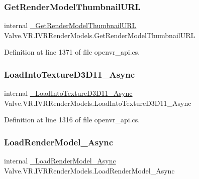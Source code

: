 \subsubsection{\texorpdfstring{GetRenderModelThumbnailURL}{GetRenderModelThumbnailURL}}
{\footnotesize\ttfamily internal \mbox{\hyperlink{struct_valve_1_1_v_r_1_1_i_v_r_render_models_afd1ebaace88f5874dc31699503bba86e}{\+\_\+\+Get\+Render\+Model\+Thumbnail\+U\+RL}} Valve.\+V\+R.\+I\+V\+R\+Render\+Models.\+Get\+Render\+Model\+Thumbnail\+U\+RL}



Definition at line 1371 of file openvr\+\_\+api.\+cs.

\mbox{\label{struct_valve_1_1_v_r_1_1_i_v_r_render_models_a1f79607150d419aba923b85209d1ea24}} 
\subsubsection{\texorpdfstring{LoadIntoTextureD3D11\_Async}{LoadIntoTextureD3D11\_Async}}
{\footnotesize\ttfamily internal \mbox{\hyperlink{struct_valve_1_1_v_r_1_1_i_v_r_render_models_a819d498723194d075a7e114272dce441}{\+\_\+\+Load\+Into\+Texture\+D3\+D11\+\_\+\+Async}} Valve.\+V\+R.\+I\+V\+R\+Render\+Models.\+Load\+Into\+Texture\+D3\+D11\+\_\+\+Async}



Definition at line 1316 of file openvr\+\_\+api.\+cs.

\mbox{\label{struct_valve_1_1_v_r_1_1_i_v_r_render_models_a5f14a839ffa684d80b4d567c024f7c2e}} 
\subsubsection{\texorpdfstring{LoadRenderModel\_Async}{LoadRenderModel\_Async}}
{\footnotesize\ttfamily internal \mbox{\hyperlink{struct_valve_1_1_v_r_1_1_i_v_r_render_models_aaf7ab82d1e0d29b1f2c7c23444deaa11}{\+\_\+\+Load\+Render\+Model\+\_\+\+Async}} Valve.\+V\+R.\+I\+V\+R\+Render\+Models.\+Load\+Render\+Model\+\_\+\+Async}



